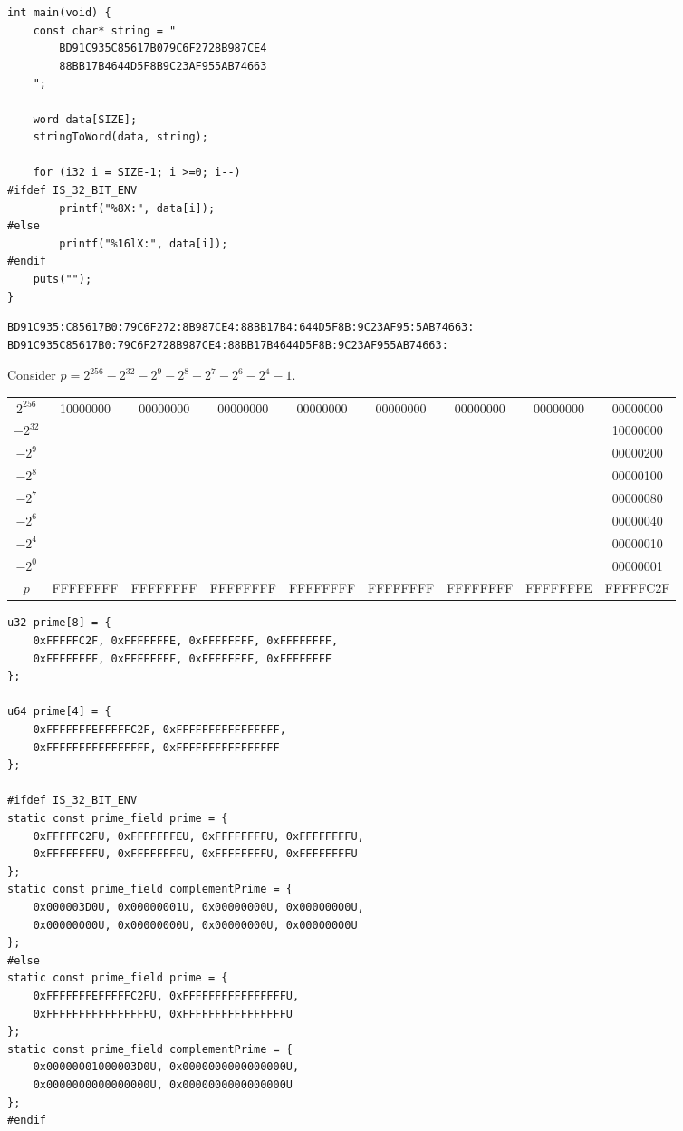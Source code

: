 \begin{lstlisting}[style=C]
int main(void) {
	const char* string = "
		BD91C935C85617B079C6F2728B987CE4
		88BB17B4644D5F8B9C23AF955AB74663
	";
	
	word data[SIZE];
	stringToWord(data, string);
	
	for (i32 i = SIZE-1; i >=0; i--)
#ifdef IS_32_BIT_ENV
		printf("%8X:", data[i]);
#else
		printf("%16lX:", data[i]);
#endif
	puts("");
}
\end{lstlisting}
{\small\begin{lstlisting}[style=zsh]
BD91C935:C85617B0:79C6F272:8B987CE4:88BB17B4:644D5F8B:9C23AF95:5AB74663:
BD91C935C85617B0:79C6F2728B987CE4:88BB17B4644D5F8B:9C23AF955AB74663:
\end{lstlisting}}

\newpage
\begin{example}[secp256k1]
Consider $p = 2^{256} - 2^{32} - 2^{9} - 2^{8} - 2^7 - 2^6 - 2^4 - 1$.
\begin{table}[h!]\centering\renewcommand{\arraystretch}{1.25}
{\ttfamily\footnotesize\begin{tabular*}{\textwidth}{@{\extracolsep{\fill}}ccccccccc}
		$2^{256}$ &  10000000 & 00000000 & 00000000 & 00000000 & 00000000 & 00000000 & 00000000 & 00000000\\
		$-2^{32}$ & & & & & & & & 10000000 \\
		$-2^{9}$ & & & & & & & & 00000200 \\
		$-2^{8}$ & & & & & & & & 00000100 \\
		$-2^{7}$ & & & & & & & & 00000080 \\
		$-2^{6}$ & & & & & & & & 00000040 \\
		$-2^{4}$ & & & & & & & & 00000010 \\
		$-2^{0}$ & & & & & & & & 00000001 \\ \cline{1-9}
		$p$ & FFFFFFFF & FFFFFFFF & FFFFFFFF & FFFFFFFF & FFFFFFFF & FFFFFFFF & FFFFFFFE & FFFFFC2F \\
\end{tabular*}}
\end{table}
\begin{lstlisting}[style=C]
u32 prime[8] = {
	0xFFFFFC2F, 0xFFFFFFFE, 0xFFFFFFFF, 0xFFFFFFFF,
	0xFFFFFFFF, 0xFFFFFFFF, 0xFFFFFFFF, 0xFFFFFFFF
};

u64 prime[4] = {
	0xFFFFFFFEFFFFFC2F, 0xFFFFFFFFFFFFFFFF,
	0xFFFFFFFFFFFFFFFF, 0xFFFFFFFFFFFFFFFF
};

#ifdef IS_32_BIT_ENV
static const prime_field prime = {
	0xFFFFFC2FU, 0xFFFFFFFEU, 0xFFFFFFFFU, 0xFFFFFFFFU,
	0xFFFFFFFFU, 0xFFFFFFFFU, 0xFFFFFFFFU, 0xFFFFFFFFU
};
static const prime_field complementPrime = {
	0x000003D0U, 0x00000001U, 0x00000000U, 0x00000000U,
	0x00000000U, 0x00000000U, 0x00000000U, 0x00000000U
};
#else
static const prime_field prime = {
	0xFFFFFFFEFFFFFC2FU, 0xFFFFFFFFFFFFFFFFU,
	0xFFFFFFFFFFFFFFFFU, 0xFFFFFFFFFFFFFFFFU
};
static const prime_field complementPrime = {
	0x00000001000003D0U, 0x0000000000000000U,
	0x0000000000000000U, 0x0000000000000000U
};
#endif
\end{lstlisting}
\end{example}

